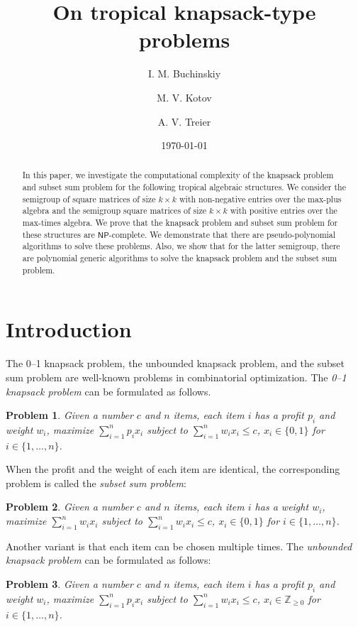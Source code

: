 \documentclass[reqno,12pt]{amsart}
\title{On tropical knapsack-type problems}
\author{I. M. Buchinskiy \and M. V. Kotov \and A. V. Treier}
\date{\today}
\newtheorem{problem}{Problem}
\theoremstyle{definition}
\begin{document}
\begin{abstract}
    In this paper, we investigate the computational complexity of the knapsack problem and subset sum problem for the following tropical algebraic structures.
    We consider the semigroup of square matrices of size $k \times k$ with non-negative entries over the max-plus algebra and the semigroup square matrices of size $k \times k$ with positive entries over the max-times algebra.
    We prove that the knapsack problem and subset sum problem for these structures are $\textsf{NP}$-complete.
    We demonstrate that there are pseudo-polynomial algorithms to solve these problems.
    Also, we show that for the latter semigroup, there are polynomial generic algorithms to solve the knapsack problem and the subset sum problem.
\end{abstract}

\maketitle

\section{Introduction}
The 0--1 knapsack problem, the unbounded knapsack problem, and the subset sum problem are well-known problems in combinatorial optimization.
The \textit{0--1 knapsack problem} can be formulated as follows.
\begin{problem}\label{P1}
    Given a number $c$ and $n$ items, each item $i$ has a profit $p_i$ and weight $w_i$, maximize $\sum_{i = 1}^n p_i x_i$ subject to $\sum_{i = 1}^n w_i x_i \leq c$, $x_i \in \{0, 1\}$ for $i \in \{1, \ldots, n\}$.
\end{problem}

When the profit and the weight of each item are identical, the corresponding problem is called the \textit{subset sum problem}:
\begin{problem}\label{P2}
    Given a number $c$ and $n$ items, each item $i$ has a weight $w_i$, maximize $\sum_{i = 1}^n w_i x_i$ subject to $\sum_{i = 1}^n w_i x_i \leq c$, $x_i \in \{0, 1\}$ for $i \in \{1, \ldots, n\}$. 
\end{problem}

Another variant is that each item can be chosen multiple times. The \textit{unbounded knapsack problem} can be formulated as follows:
\begin{problem}\label{P3}
    Given a number $c$ and $n$ items, each item $i$ has a profit $p_i$ and weight $w_i$, maximize $\sum_{i = 1}^n p_i x_i$ subject to $\sum_{i = 1}^n w_i x_i \leq c$, $x_i \in \mathbb{Z}_{\geq 0}$ for $i \in \{1, \ldots, n\}$.
\end{problem}
\end{document}
